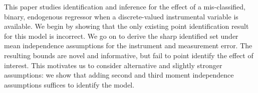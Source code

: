 This paper studies identification and inference for the effect of a mis-classified, binary, endogenous regressor when a discrete-valued instrumental variable is available. 
We begin by showing that the only existing point identification result for this model is incorrect. 
We go on to derive the sharp identified set under mean independence assumptions for the instrument and measurement error.
The resulting bounds are novel and informative, but fail to point identify the effect of interest.
This motivates us to consider alternative and slightly stronger assumptions: we show that adding second and third moment independence assumptions suffices to identify the model.
